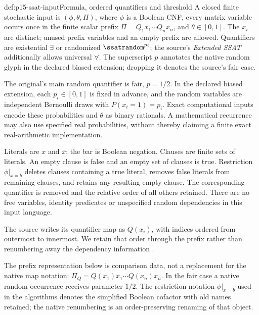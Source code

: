\begin{hbdefinition}{def:p15-ssat-input}{Formula, ordered quantifiers and threshold}
A closed finite stochastic input is \((\phi,\theta,\Pi)\), where
\(\phi\) is a Boolean CNF, every matrix variable occurs once in the
finite scalar prefix \(\Pi=Q_1x_1\cdots Q_nx_n\), and
\(\theta\in[0,1]\). The \(x_i\) are distinct; unused prefix
variables and an empty prefix are allowed. Quantifiers are existential
\(\exists\) or randomized \(\ssatrandom^{p_i}\); the source's
\emph{Extended SSAT} additionally allows universal \(\forall\).
The superscript \(p\) annotates the native random glyph in the declared
biased extension; dropping it denotes the source's fair case.

The original's main random quantifier is fair, \(p=1/2\). In the
declared biased extension, each \(p_i\in[0,1]\) is fixed in advance,
and the random variables are independent Bernoulli draws with
\(P(x_i=1)=p_i\). Exact computational inputs encode these probabilities
and \(\theta\) as binary rationals. A mathematical recurrence may
also use specified real probabilities, without thereby claiming a finite
exact real-arithmetic implementation.

Literals are \(x\) and \(\bar x\); the bar is Boolean negation.
Clauses are finite sets of literals. An empty clause is false and an
empty set of clauses is true. Restriction \(\phi|_{x=b}\) deletes
clauses containing a true literal, removes false literals from remaining
clauses, and retains any resulting empty clause. The corresponding
quantifier is removed and the relative order of all others retained.
There are no free variables, identity predicates or unspecified random
dependencies in this input language.
\end{hbdefinition}

The source writes its quantifier map as \(Q(x_i)\), with indices
ordered from outermost to innermost. We retain that order through the
prefix rather than renumbering away the dependency information
\cite[sec.~1.2.1, pp.~3--5]{LittmanMajercikPitassi2000SSATAuthor}.

The prefix representation below is comparison data, not a replacement for
the native map notation: \(\Pi_Q=Q(x_1)x_1\cdots Q(x_n)x_n\).
In the fair case a native random occurrence receives parameter \(1/2\).
The restriction notation \(\phi|_{x=b}\) used in the algorithms denotes
the simplified Boolean cofactor with old names retained; the native
renumbering is an order-preserving renaming of that object.

